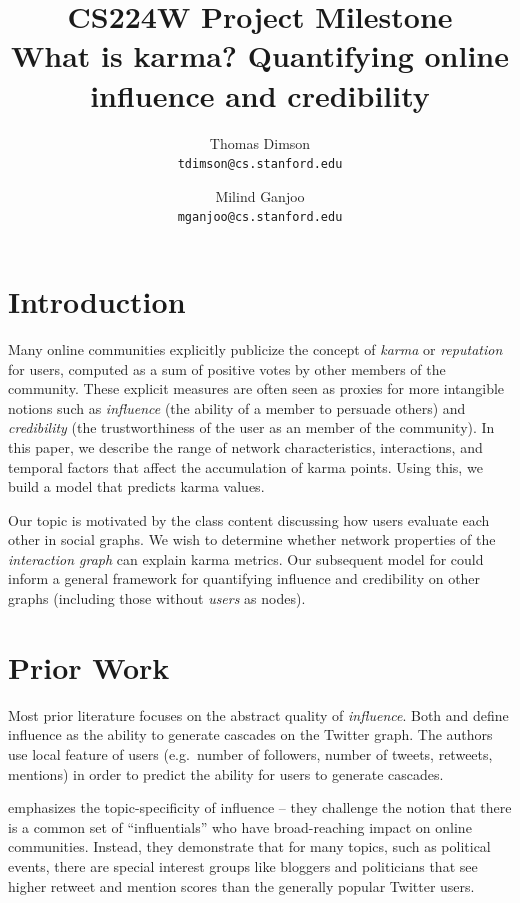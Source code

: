 \documentclass[10pt]{article}
\title{{\large CS224W Project Milestone} \\
  What is karma? Quantifying online influence and credibility
}
\author{Thomas Dimson \\ {\tt tdimson@cs.stanford.edu}
  \and
  Milind Ganjoo \\ {\tt mganjoo@cs.stanford.edu}
}
\date{}
\begin{document}
\maketitle

\section{Introduction}

Many online communities explicitly publicize the concept of \textit{karma} or
\textit{reputation} for users, computed as a sum of positive votes by other members of
the community. These explicit measures are often seen as proxies for more
intangible notions such as \textit{influence} (the ability of a member to
persuade others) and \textit{credibility} (the trustworthiness of the user as an
member of the community). In this paper, we describe the range of network
characteristics, interactions, and temporal factors that affect the accumulation
of karma points. Using this, we build a model that predicts karma values.

Our topic is motivated by the class content discussing how users evaluate
each other in social graphs. We wish to determine whether network properties of the 
\textit{interaction graph} can explain karma metrics. Our subsequent model for 
could inform a general framework for quantifying influence and credibility
on other graphs (including those without \textit{users} as nodes).

\section{Prior Work}

Most prior literature focuses on the abstract quality of \textit{influence}.
Both \citet{bakshy2011everyone} and \citet{cha2010measuring} define
influence as the ability to generate cascades on the Twitter graph. The authors
use local feature of users (e.g.\ number of followers, number of tweets,
retweets, mentions) in order to predict the ability for users to generate
cascades.

\citet{cha2010measuring} emphasizes the topic-specificity of influence -- they challenge
the notion that there is a common set of ``influentials'' who have
broad-reaching impact on online communities. Instead, they demonstrate that for
many topics, such as political events, there are special interest groups like
bloggers and politicians that see higher retweet and mention scores than the
generally popular Twitter users.
\end{document}
